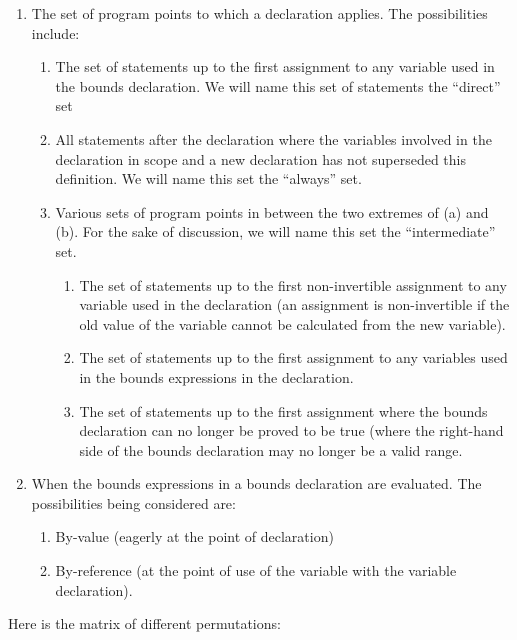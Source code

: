 \begin{enumerate}
\item
  The set of program points to which a declaration applies. The
  possibilities include:

  \begin{enumerate}
  \item
    The set of statements up to the first assignment to any variable
    used in the bounds declaration. We will name this set of statements
    the ``direct'' set
  \item
    All statements after the declaration where the variables involved in
    the declaration in scope and a new declaration has not superseded
    this definition. We will name this set the ``always'' set.
  \item
    Various sets of program points in between the two extremes of (a)
    and (b). For the sake of discussion, we will name this set the
    ``intermediate'' set.

    \begin{enumerate}
    \item
      The set of statements up to the first non-invertible assignment to
      any variable used in the declaration (an assignment is
      non-invertible if the old value of the variable cannot be
      calculated from the new variable).
    \item
      The set of statements up to the first assignment to any variables
      used in the bounds expressions in the declaration.
    \item
      The set of statements up to the first assignment where the bounds
      declaration can no longer be proved to be true (where the
      right-hand side of the bounds declaration may no longer be a valid
      range.
    \end{enumerate}
  \end{enumerate}
\item
  When the bounds expressions in a bounds declaration are evaluated. The
  possibilities being considered are:

  \begin{enumerate}
  \item
    By-value (eagerly at the point of declaration)
  \item
    By-reference (at the point of use of the variable with the variable
    declaration).
  \end{enumerate}
\end{enumerate}

Here is the matrix of different permutations:

